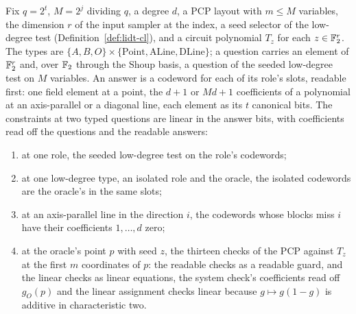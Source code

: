 \begin{definition}
\label{def:ar-tailored-game}
\leanok
Fix $q = 2^t$, $M = 2^j$ dividing $q$, a degree $d$, a PCP layout with $m \leq M$ variables, the
dimension $r$ of the input sampler at the index, a seed selector of the low-degree test
(Definition~\ref{def:lidt-cl}), and a circuit polynomial $T_z$ for each $z \in \mathbb{F}_2^r$. The types
are $\{A, B, O\} \times \{\mathrm{Point}, \mathrm{ALine}, \mathrm{DLine}\}$; a question carries an
element of $\mathbb{F}_2^r$ and, over $\mathbb{F}_2$ through the Shoup basis, a question of the seeded low-degree
test on $M$ variables. An answer is a codeword for each of its role's slots, readable first: one
field element at a point, the $d + 1$ or $Md + 1$ coefficients of a polynomial at an
axis-parallel or a diagonal line, each element as its $t$ canonical bits. The constraints at two
typed questions are linear in the answer bits, with coefficients read off the questions and the
readable answers:
\begin{enumerate}
\item at one role, the seeded low-degree test on the role's codewords;
\item at one low-degree type, an isolated role and the oracle, the isolated codewords are the
  oracle's in the same slots;
\item at an axis-parallel line in the direction $i$, the codewords whose blocks miss $i$ have
  their coefficients $1, \dots, d$ zero;
\item at the oracle's point $p$ with seed $z$, the thirteen checks of the PCP against $T_z$ at
  the first $m$ coordinates of $p$: the readable checks as a readable guard, and the linear checks
  as linear equations, the system check's coefficients read off $g_O(p)$ and the linear
  assignment checks linear because $g \mapsto g(1 - g)$ is additive in characteristic two.
\end{enumerate}
\end{definition}

